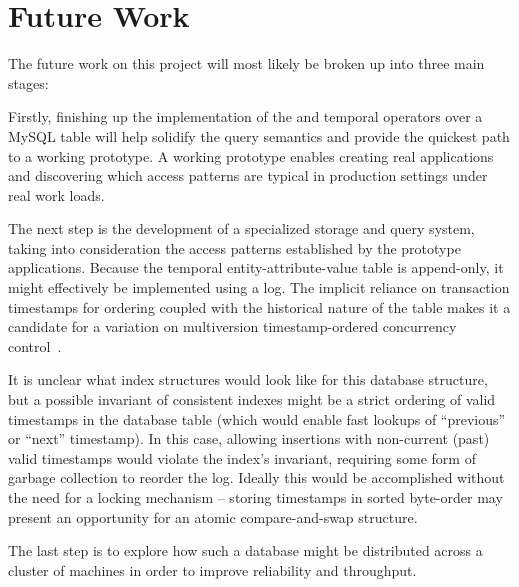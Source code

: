 \section{Future Work} \label{section:futurework}

The future work on this project will most likely be broken up into three main stages:

Firstly, finishing up the implementation of the  and  temporal operators
over a MySQL table will help solidify the query semantics and provide the quickest path to a working prototype.
A working prototype enables creating real applications and discovering which access patterns are typical
in production settings under real work loads.

The next step is the development of a specialized storage and query system,
taking into consideration the access patterns established by the prototype
applications. Because the temporal entity-attribute-value table is append-only,
it might effectively be implemented using a log. The implicit reliance on transaction timestamps
for ordering coupled with the historical nature of the table makes it a candidate for a variation on multiversion
timestamp-ordered concurrency control~\cite{bernstein1981concurrency}.

It is unclear what index structures would look like for this database
structure, but a possible invariant of consistent indexes might be a strict
ordering of valid timestamps in the database table (which would enable fast
lookups of ``previous'' or ``next'' timestamp). In this case, allowing
insertions with non-current (past) valid timestamps would violate the index's
invariant, requiring some form of garbage collection to reorder the log.
Ideally this would be accomplished without the need for a locking mechanism --
storing timestamps in sorted byte-order may present an opportunity for an
atomic compare-and-swap structure.

The last step is to explore how such a database might be distributed across a
cluster of machines in order to improve reliability and throughput.
